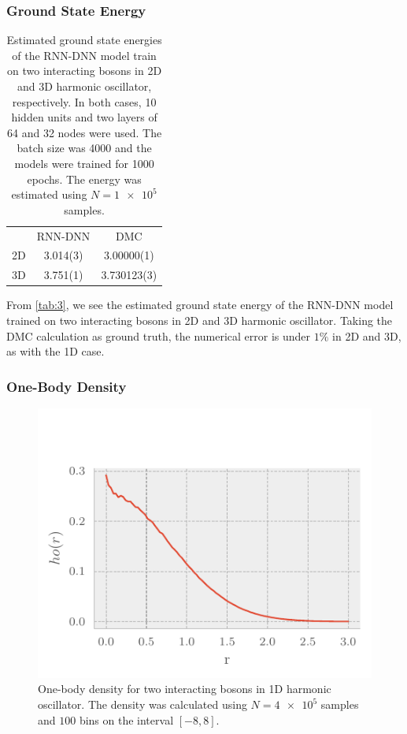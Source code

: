 \subsubsection{Ground State Energy}

\begin{table}[ht]
	\begin{tabular}{r|SS}
		\toprule
		      & {RNN-DNN}   & {DMC}     \\
		2D    & 3.014(3)  &  3.00000(1) \\
		3D    & 3.751(1)  &   3.730123(3) \\
		\bottomrule
	\end{tabular}
	\caption{Estimated ground state energies of the RNN-DNN model train on two interacting bosons in 2D and 3D harmonic oscillator, respectively. In both cases, 10 hidden units and two layers of 64 and 32 nodes were used. The batch size was 4000 and the models were trained for 1000 epochs. The energy was estimated using $N=\num{1e5}$ samples.}
	\label{tab:3}
\end{table}

From \autoref{tab:3}, we see the estimated ground state energy of the RNN-DNN model trained on two interacting bosons in 2D and 3D harmonic oscillator. Taking the DMC calculation as ground truth, the numerical error is under $1\%$ in 2D and 3D, as with the 1D case. 

\subsubsection{One-Body Density}
\begin{figure}[H]
	\includegraphics[]{figures/many_part_3D.pdf}
	\caption{One-body density for two interacting bosons in 1D harmonic
      oscillator. The density was calculated using $N=\num{4e5}$ samples and $100$
      bins on the interval $[-8,8]$.} 
	\label{fig:many_part_3D}
\end{figure}

